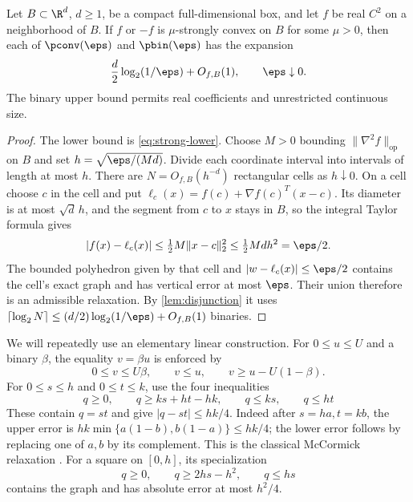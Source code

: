 \begin{corollary}\label{cor:c2-strong}
Let $B\subset\R^d$, $d\ge1$, be a compact full-dimensional box, and
let $f$ be real $C^2$ on a neighborhood of $B$. If $f$ or $-f$ is
$\mu$-strongly convex on $B$ for some $\mu>0$, then each of
$\pconv(\eps)$ and $\pbin(\eps)$ has the expansion
\[
 \frac d2\log_2(1/\eps)+O_{f,B}(1),\qquad\eps\downarrow0.
\]
The binary upper bound permits real coefficients and unrestricted
continuous size.
\end{corollary}
\begin{proof}
The lower bound is \eqref{eq:strong-lower}. Choose $M>0$ bounding
$\|\nabla^2f\|_{\mathrm{op}}$ on $B$ and set
$h=\sqrt{\eps/(Md)}$. Divide each coordinate interval into intervals
of length at most $h$. There are $N=O_{f,B}(h^{-d})$ rectangular
cells as $h\downarrow0$. On a cell choose $c$ in the cell and put
$\ell_c(x)=f(c)+\nabla f(c)^T(x-c)$. Its diameter is at most
$\sqrt d\,h$, and the segment from $c$ to $x$ stays in $B$, so the
integral Taylor formula gives
\[
 |f(x)-\ell_c(x)|\le\tfrac12 M\|x-c\|_2^2
 \le\tfrac12 Md h^2=\eps/2.
\]
The bounded polyhedron given by that cell and
$|w-\ell_c(x)|\le\eps/2$ contains the cell's exact graph and has
vertical error at most $\eps$. Their union therefore is an admissible
relaxation. By \cref{lem:disjunction} it uses
$\lceil\log_2N\rceil\le(d/2)\log_2(1/\eps)+O_{f,B}(1)$ binaries.
\end{proof}

We will repeatedly use an elementary linear construction. For
$0\le u\le U$ and a binary $\beta$, the equality $v=\beta u$ is enforced by
\begin{equation}\label{eq:binary-product}
 0\le v\le U\beta,\qquad v\le u,\qquad
 v\ge u-U(1-\beta).
\end{equation}
For $0\le s\le h$ and $0\le t\le k$, use the four inequalities
\begin{equation}\label{eq:mccormick}
 q\ge0,\qquad q\ge ks+ht-hk,\qquad q\le ks,\qquad q\le ht
\end{equation}
These contain $q=st$ and give $|q-st|\le hk/4$.
Indeed after $s=ha,t=kb$, the upper error is
$hk\min\{a(1-b),b(1-a)\}\le hk/4$; the lower error follows by
replacing one of $a,b$ by its complement. This is the classical
McCormick relaxation \citep{mccormick1976}.
For a square on $[0,h]$, its specialization
\begin{equation}\label{eq:square-triangle}
 q\ge0,\qquad q\ge2hs-h^2,\qquad q\le hs
\end{equation}
contains the graph and has absolute error at most $h^2/4$.

